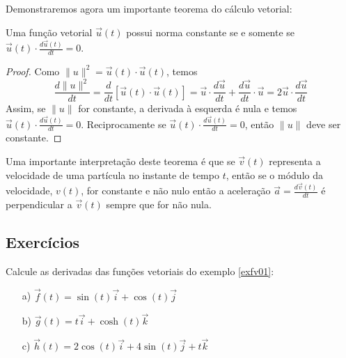 Demonstraremos agora um importante teorema do cálculo vetorial:
\begin{teo}\label{teodernormacst} Uma função vetorial $\vec{u}(t)$ possui norma constante se e somente se $\vec{u}(t)\cdot\frac{d\vec{u}(t)}{dt}=0$.
\end{teo}
\begin{proof} Como $\|u\|^2=\vec{u}(t)\cdot\vec{u}(t)$, temos
$$\frac{d \|u\|^2}{dt}=\frac{d}{dt}\left[\vec{u}(t)\cdot\vec{u}(t)\right]=\vec{u}\cdot\frac{d\vec{u}}{dt}+\frac{d\vec{u}}{dt}\cdot\vec{u}=2\vec{u}\cdot\frac{d\vec{u}}{dt}$$
Assim, se $\|u\|$ for constante, a derivada à esquerda é nula e temos $\vec{u}(t)\cdot\frac{d\vec{u}(t)}{dt}=0$. Reciprocamente se $\vec{u}(t)\cdot\frac{d\vec{u}(t)}{dt}=0$, então $\|u\|$ deve ser constante.
\end{proof}
\begin{obs} Uma importante interpretação deste teorema é que se $\vec{v}(t)$ representa a velocidade de uma partícula no instante de tempo $t$, então se o módulo da velocidade, $v(t)$, for constante e não nulo então a aceleração $\vec{a}=\frac{d\vec{v}(t)}{dt}$ é perpendicular a $\vec{v}(t)$ sempre que for não nula.
\end{obs}







\subsection*{Exercícios}

\begin{exer}Calcule as derivadas das funções vetoriais do exemplo \ref{exfv01}:
\begin{itemize}
\item [a)] $\vec{f}(t)=\sin(t)\vec{i}+\cos(t)\vec{j}$
\item [b)] $\vec{g}(t)=t \vec{i}+\cosh(t)\vec{k}$
\item [c)] $\vec{h}(t)=2\cos(t)\vec{i}+4\sin(t)\vec{j}+t\vec{k}$
\end{itemize}
\end{exer}

